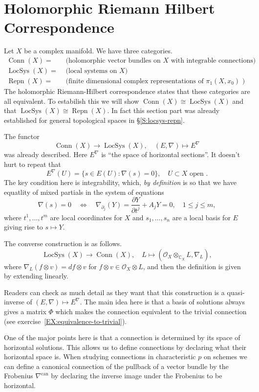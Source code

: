 \documentclass[12pt]{book}
\numberwithin{equation}{section}
\theoremstyle{definition}
\theoremstyle{remark}
\newcommand{\CC}{\mathbb{C}}
\newcommand{\Ocal}{\mathcal{O}}
\newcommand{\LocSys}{\operatorname{LocSys}}
\newcommand{\Conn}{\operatorname{Conn}}
\newcommand{\Repn}{\operatorname{Repn}}
\newcommand{\can}{\operatorname{can}}
\begin{document}
\section{Holomorphic Riemann Hilbert Correspondence}
Let $X$ be a complex manifold. 
We have three categories.
\begin{align*}
\Conn(X) =& \mbox{ (holomorphic vector bundles on $X$ with integrable connections)} \\
\LocSys(X) =& \mbox{ (local systems on $X$) } \\
\Repn(X) =& \mbox{ (finite dimensional complex representations of $\pi_1(X,x_0)$ )}
\end{align*}
The holomorphic Riemann-Hilbert correspondence states that these categories are all equivalent. 
To estabilish this we will show $\Conn(X) \cong \LocSys(X)$ and that $\LocSys(X) \cong \Repn(X)$. 
In fact this section part was already established for general topological spaces in \S\ref{S:locsys-repn}.

The functor 
$$\Conn(X) \to \LocSys(X), \quad (E,\nabla) \mapsto E^{\nabla}$$ was already described.
Here $E^{\nabla}$ is ``the space of horizontal sections''. 
It doesn't hurt to repeat that 
$$ E^{\nabla}(U) = \lbrace s \in E(U) \colon \nabla(s) =0 \rbrace, \quad U\subset X \mbox{ open }.$$
The key condition here is integrability, which, \emph{by definition} is so that we have equatlity of mixed partials in the system of equations 
$$ \nabla(s)=0 \quad \iff  \quad \nabla_{\partial_j}(Y) = \dfrac{\partial Y}{\partial t^j} + A_j Y =0, \quad 1\leq j \leq m,$$
where $t^1,\ldots,t^m$ are local coordinates for $X$ and $s_1,\ldots,s_n$ are a local basis for $E$ giving rise to $s \mapsto Y$. 

The converse construction is as follows.
$$ \LocSys(X) \to \Conn(X), \quad L \mapsto (\Ocal_X\otimes_{\CC_X} L, \nabla_L),$$
where $\nabla_L(f\otimes v) = df \otimes v$ for $f\otimes v \in \Ocal_X \otimes L$, and then the definition is given by extending linearly.

Readers can check as much detail as they want that this construction is a quasi-inverse of $(E,\nabla)\mapsto E^{\nabla}$. 
The main idea here is that a basis of solutions always gives a matrix $\Phi$ which makes the connection equivalent to the trivial connection (see exercise~\ref{EX:equivalence-to-trivial}).

One of the major points here is that a connection is determined by its space of horizontal solutions. 
This allows us to define connections by declaring what their horizontal space is. 
When studying connections in characteristic $p$ on schemes we can define a canonical connection of the pullback of a vector bundle by the Frobenius $\nabla^{\can}$ by declaring the inverse image under the Frobenius to be horizontal.
\end{document}
